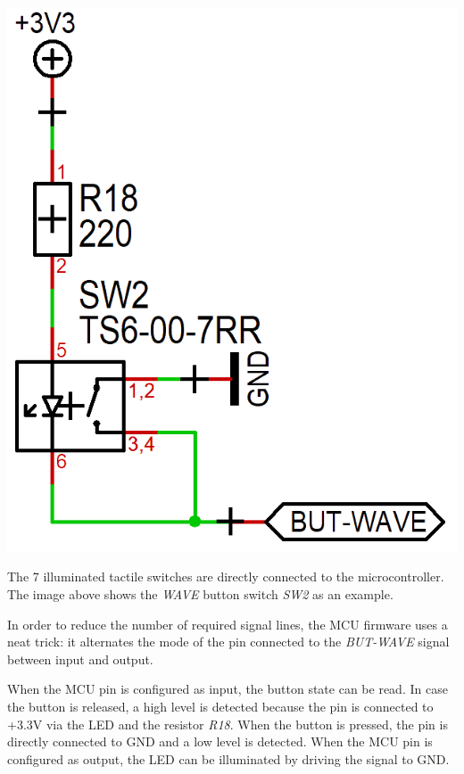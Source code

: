 \documentclass{scrartcl}
\begin{document}
\begin{center}
    \includegraphics[scale=0.25]{assets/schema-switch.png}
\end{center}

The 7 illuminated tactile switches are directly connected to the microcontroller. The image above shows the \emph{WAVE} button switch \emph{SW2} as an example.

In order to reduce the number of required signal lines, the MCU firmware uses a neat trick: it alternates the mode of the pin connected to the \emph{BUT-WAVE} signal between input and output.

When the MCU pin is configured as input, the button state can be read. In case the button is released, a high level is detected because the pin is connected to +3.3V via the LED and the resistor \emph{R18}. When the button is pressed, the pin is directly connected to GND and a low level is detected. When the MCU pin is configured as output, the LED can be illuminated by driving the signal to GND.

\pagebreak

\end{document}

